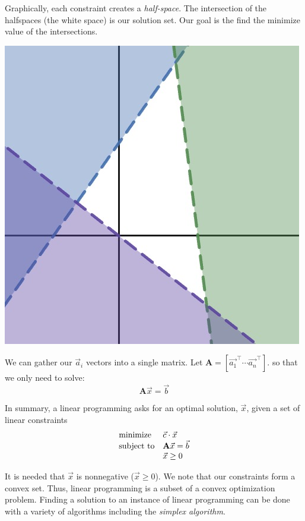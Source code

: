 \documentclass{article}
\begin{document}
Graphically, each constraint creates a \emph{half-space}. 
The intersection of the halfspaces (the white space) is our solution set. 
Our goal is the find the minimize value of the intersections.
\begin{center}
  \includegraphics[scale=.2]{assets/half_space.jpg}  
\end{center}

We can gather our \( \vec{a}_i \) vectors into a single matrix. 
Let $\mathbf{A} = [\vec{a_1}^\top \cdots \vec{a_n}^\top]$.
so that we only need to solve:
\[
\mathbf{A} \vec{x} = \vec{b}
\]

In summary, a linear programming asks for an optimal solution, \( \vec{x} \), given a set of linear constraints
\begin{align*}
  \begin{array}{ll@{}ll}
    \text{minimize} & \vec{c} \cdot \vec{x}&\\
    \text{subject to}& \mathbf{A} \vec{x} = \vec{b} \\
    & \vec{x} \geq 0 \\
    \end{array}
\end{align*}

It is needed that \( \vec{x} \) is nonnegative (\( \vec{x} \geq 0 \)). We note that our constraints form a convex set.
Thus, linear programming is a subset of a convex optimization problem.
Finding a solution to an instance of linear programming can be done with a variety of algorithms including the \emph{simplex algorithm}.
\end{document}
